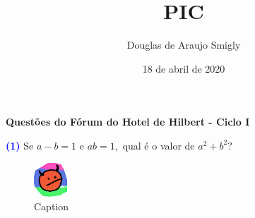 \documentclass[12pt, a4paper]{article}
\title{PIC}
\author{Douglas de Araujo Smigly}
\date{18 de abril de 2020}
\begin{document}
\maketitle
\begin{center}
\large\textbf{\textcolor{Floresta}{Questões do Fórum do Hotel de Hilbert - Ciclo I }}\\
\end{center}
\textcolor{blue}{\bf(1)} Se $a - b = 1$ e $ab = 1,$ qual é o valor de $a^2 + b^2?$
\begin{figure}[!h]
    \centering
    \includegraphics{lgogo.jpg}
    \caption{Caption}
    \label{fig:my_label}
\end{figure}
\end{document}
